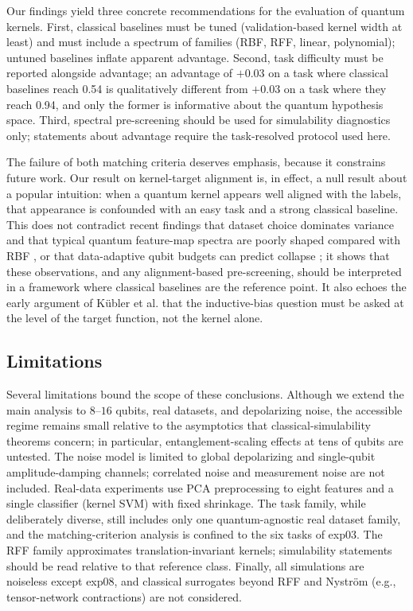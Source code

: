 \documentclass[aps,pra,preprint]{revtex4-2}
\begin{document}
Our findings yield three concrete recommendations for the evaluation of quantum kernels.
First, classical baselines must be tuned (validation-based kernel width at least) and
must include a spectrum of families (RBF, RFF, linear, polynomial); untuned baselines
inflate apparent advantage. Second, task difficulty must be reported alongside
advantage; an advantage of $+0.03$ on a task where classical baselines reach 0.54 is
qualitatively different from $+0.03$ on a task where they reach 0.94, and only the
former is informative about the quantum hypothesis space. Third, spectral
pre-screening should be used for simulability diagnostics only; statements about
advantage require the task-resolved protocol used here.

The failure of both matching criteria deserves emphasis, because it constrains future
work. Our result on kernel-target alignment is, in effect, a null result about a
popular intuition: when a quantum kernel appears well aligned with the labels, that
appearance is confounded with an easy task and a strong classical baseline. This does
not contradict recent findings that dataset choice dominates variance and that typical
quantum feature-map spectra are poorly shaped compared with RBF \cite{kakavand2026},
or that data-adaptive qubit budgets can predict collapse \cite{appel2026}; it shows
that these observations, and any alignment-based pre-screening, should be interpreted
in a framework where classical baselines are the reference point. It also echoes the
early argument of K\"ubler et al. \cite{kubler2021} that the inductive-bias question
must be asked at the level of the target function, not the kernel alone.

\subsection{Limitations}
\label{sec:limitations}

Several limitations bound the scope of these conclusions. Although we extend the main
analysis to $8$--$16$ qubits, real datasets, and depolarizing noise, the accessible
regime remains small relative to the asymptotics that classical-simulability theorems
concern; in particular, entanglement-scaling effects at tens of qubits are untested.
The noise model is limited to global depolarizing and single-qubit amplitude-damping
channels; correlated noise and measurement noise are not included. Real-data
experiments use PCA preprocessing to eight features and a single classifier (kernel
SVM) with fixed shrinkage. The task family, while deliberately diverse, still includes
only one quantum-agnostic real dataset family, and the matching-criterion analysis is
confined to the six tasks of exp03. The RFF family approximates translation-invariant
kernels; simulability statements should be read relative to that reference class.
Finally, all simulations are noiseless except exp08, and classical surrogates beyond
RFF and Nystr\"om (e.g., tensor-network contractions) are not considered.
\end{document}
